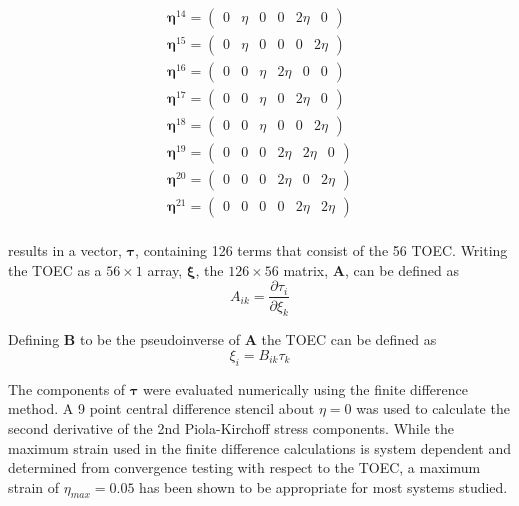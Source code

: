 \documentclass[showpacs,aps,floatfix,prb,reprint,superscriptaddress,onecolumn]{revtex4-1}
\begin{document}
\begin{subequations}
\begin{align}
    	\bm{\eta}^{14} =\left(\begin{matrix} 0 & \eta & 0 & 0 & 2\eta & 0 \end{matrix}\right)\\
    	\bm{\eta}^{15} =\left(\begin{matrix} 0 & \eta & 0 & 0 & 0 & 2\eta \end{matrix}\right)\\
    	\bm{\eta}^{16} =\left(\begin{matrix} 0 & 0 & \eta & 2\eta & 0 & 0 \end{matrix}\right)\\
    	\bm{\eta}^{17} =\left(\begin{matrix} 0 & 0 & \eta & 0 & 2\eta & 0 \end{matrix}\right)\\
    	\bm{\eta}^{18} =\left(\begin{matrix} 0 & 0 & \eta & 0 & 0 & 2\eta \end{matrix}\right)\\
    	\bm{\eta}^{19} =\left(\begin{matrix} 0 & 0 & 0 & 2\eta & 2\eta & 0 \end{matrix}\right)\\
    	\bm{\eta}^{20} =\left(\begin{matrix} 0 & 0 & 0 & 2\eta & 0 & 2\eta \end{matrix}\right)\\
    	\bm{\eta}^{21} =\left(\begin{matrix} 0 & 0 & 0 & 0 & 2\eta & 2\eta \end{matrix}\right)\\
\end{align}
\end{subequations}
 

results in a vector, $\bm{\tau}$, containing 126 terms that consist of the 56 TOEC.  Writing the TOEC as a $56\times1$ array, $\bm{\xi}$, the $126\times56$ matrix, $\bm{A}$, can be defined as
\begin{equation}
A_{ik} = \frac{\partial \tau_i}{\partial \xi_k}
\end{equation}

Defining $\bm{B}$ to be the pseudoinverse of $\bm{A}$ the TOEC can be defined as
\begin{equation}
\xi_i = B_{i k} \tau_k
\end{equation}

The components of $\bm{\tau}$ were evaluated numerically using the finite difference method.  A 9 point central difference stencil about $\eta=0$ was used to calculate the second derivative of the 2nd Piola-Kirchoff stress components.    While the maximum strain used in the finite difference calculations is system dependent and determined from convergence testing with respect to the TOEC, a maximum strain of $\eta_{max} = 0.05$ has been shown to be appropriate for most systems studied.
\end{document}
